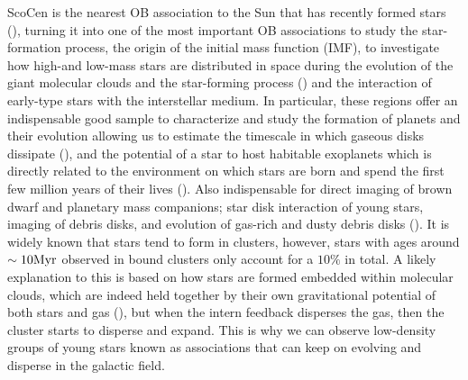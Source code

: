 ScoCen is the nearest OB association to the Sun that has recently formed stars  (\citeyear{2018MNRAS.tmp..210W}), turning it into one of the most important OB associations to study the star-formation process, the origin of the initial mass function (IMF), to investigate how high-and low-mass stars are distributed in space during the evolution of the giant molecular clouds and the star-forming process  (\citeyear{1989A&A...216...44D}) and the interaction of early-type stars with the interstellar medium. In particular, these regions offer an indispensable good sample to characterize and study the formation of planets and their evolution allowing us to estimate the timescale in which gaseous disks dissipate  (\citeyear{2018arXiv180200878M}), and the potential of a star to host habitable exoplanets which is directly related to the environment on which stars are born and spend the first few million years of their lives  (\citeyear{2018MNRAS.tmp..210W}). Also indispensable for direct imaging of brown dwarf and planetary mass companions; star disk interaction of young stars, imaging of debris disks, and evolution of gas-rich and dusty debris disks  (\citeyear{2016MNRAS.461..794P}). It is widely known that stars tend to form in clusters, however, stars with ages around $\sim10 \textnormal{Myr}$ observed in bound clusters only account for a $10\%$ in total. A likely explanation to this is based on how stars are formed embedded within molecular clouds, which are indeed held together by their own gravitational potential of both stars and gas  (\citeyear{2018MNRAS.tmp..210W}), but when the intern feedback disperses the gas, then the cluster starts to disperse and expand. This is why we can observe low-density groups of young stars known as associations that can keep on evolving and disperse in the galactic field.\\


